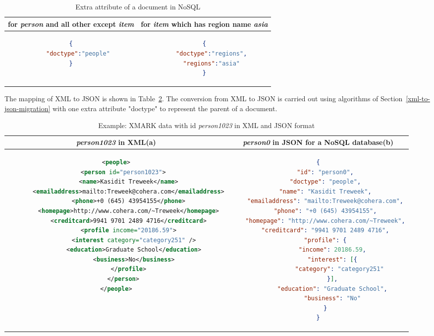\begin{longtable}{c|c}
	\caption{ Extra attribute of a document in NoSQL}
	\label{tbl:xmark-item-type}\\
    {for \textit{person} and all other except \textit{item} } & {for \textit{item} which has region name \textit{asia}}\\
	\hline
\begin{minipage}{.4\textwidth}
\begin{lstlisting}[language=JSON]
{
	"doctype":"people"
}
\end{lstlisting}
\end{minipage} &
\begin{minipage}{.4\textwidth}
\begin{lstlisting}[language=JSON]
{
	"doctype":"regions",
	"regions":"asia"
}
\end{lstlisting}
\end{minipage}
\end{longtable}

The mapping of XML to JSON is shown in Table~\ref{tbl:xmark-xml-json}. The conversion from XML to JSON is carried out using  algorithms of Section~\ref{xml-to-json-migration} with one extra attribute "doctype" to represent the parent of a document.
\begin{longtable}{c|c}
	\caption{Example: XMARK data with id \textit{person1023} in XML and JSON format }
	\label{tbl:xmark-xml-json}\\
	{\textit{person1023}} in XML(a) & {\textit{person0}} in JSON for a NoSQL database(b)\\
	\hline
	\begin{minipage}{.4\textwidth}
\centering		
\begin{lstlisting}[language=XML,basicstyle = \tiny,label=code:xml-nosql-person0]
<people>
    <person id="person1023">
       <name>Kasidit Treweek</name>
       <emailaddress>mailto:Treweek@cohera.com</emailaddress>
       <phone>+0 (645) 43954155</phone>
       <homepage>http://www.cohera.com/~Treweek</homepage>
       <creditcard>9941 9701 2489 4716</creditcard>
       <profile income="20186.59">
          <interest category="category251" />
          <education>Graduate School</education>
          <business>No</business>
       </profile>
    </person>
</people>
\end{lstlisting}	
	\end{minipage} &
	\begin{minipage}{.55\textwidth}
		\centering
		\begin{lstlisting}[language=JSON, basicstyle =\tiny, label=code:json-nosql-person0]
{
	"id": "person0",
	"doctype": "people",
	"name": "Kasidit Treweek",
	"emailaddress": "mailto:Treweek@cohera.com",
	"phone": "+0 (645) 43954155",
	"homepage": "http://www.cohera.com/~Treweek",
	"creditcard": "9941 9701 2489 4716",
	"profile": {
		"income": 20186.59,
		"interest": [{
			"category": "category251"
		}],
		"education": "Graduate School",
		"business": "No"
	}
}
		\end{lstlisting}
	\end{minipage}\\
\end{longtable}

